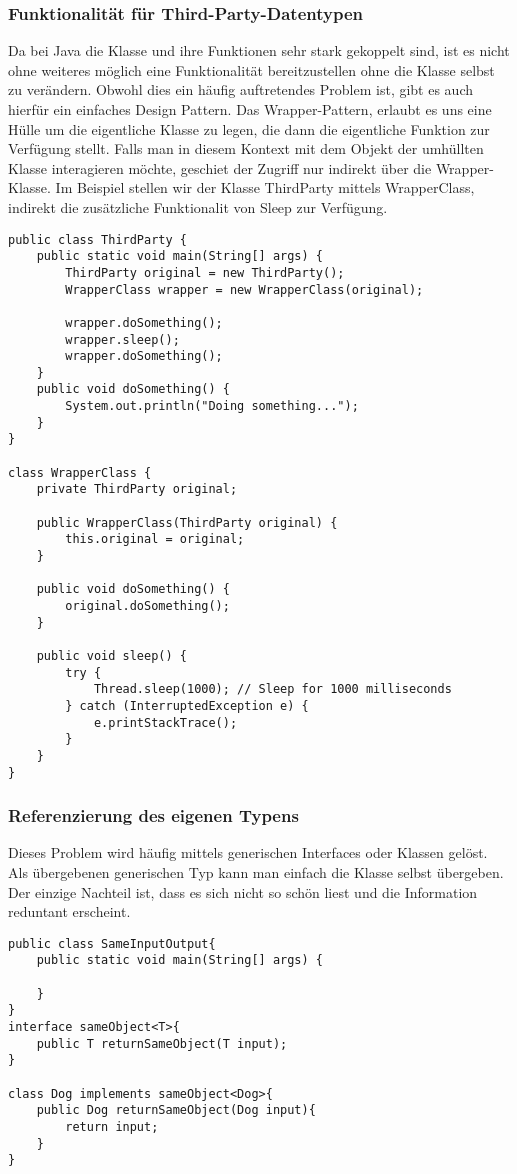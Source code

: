 \documentclass[a4paper, 1ppt]{article}
\begin{document}
\subsubsection{Funktionalität für Third-Party-Datentypen}
Da bei Java die Klasse und ihre Funktionen sehr stark gekoppelt sind, ist es nicht ohne weiteres möglich eine Funktionalität bereitzustellen ohne die Klasse selbst zu verändern.
Obwohl dies ein häufig auftretendes Problem ist, gibt es auch hierfür ein einfaches Design Pattern.
Das Wrapper-Pattern\cite{websitedesignpatterns}, erlaubt es uns eine Hülle um die eigentliche Klasse zu legen, die dann die eigentliche Funktion zur Verfügung stellt.
Falls man in diesem Kontext mit dem Objekt der umhüllten Klasse interagieren möchte, geschiet der Zugriff nur indirekt über die Wrapper-Klasse.
Im Beispiel stellen wir der Klasse ThirdParty mittels WrapperClass, indirekt die zusätzliche Funktionalit von Sleep zur Verfügung.
\begin{verbatim}
public class ThirdParty {
    public static void main(String[] args) {
        ThirdParty original = new ThirdParty();
        WrapperClass wrapper = new WrapperClass(original);

        wrapper.doSomething();
        wrapper.sleep();
        wrapper.doSomething();
    }
    public void doSomething() {
        System.out.println("Doing something...");
    }
}

class WrapperClass {
    private ThirdParty original;

    public WrapperClass(ThirdParty original) {
        this.original = original;
    }

    public void doSomething() {
        original.doSomething();
    }

    public void sleep() {
        try {
            Thread.sleep(1000); // Sleep for 1000 milliseconds
        } catch (InterruptedException e) {
            e.printStackTrace();
        }
    }
}
\end{verbatim}
\subsubsection{Referenzierung des eigenen Typens}
Dieses Problem wird häufig mittels generischen Interfaces oder Klassen gelöst.
Als übergebenen generischen Typ kann man einfach die Klasse selbst übergeben. Der einzige Nachteil ist, dass es sich nicht so schön liest und die Information reduntant erscheint.
\begin{verbatim}
public class SameInputOutput{
    public static void main(String[] args) {
        
    }
}
interface sameObject<T>{
    public T returnSameObject(T input);
}

class Dog implements sameObject<Dog>{
    public Dog returnSameObject(Dog input){
        return input;
    }
}
\end{verbatim}
\end{document}
